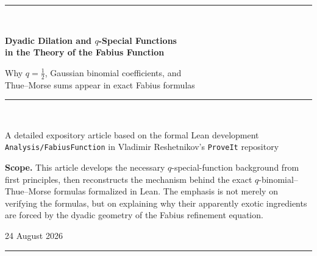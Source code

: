 \documentclass[11pt,oneside]{article}
\theoremstyle{definition}
\theoremstyle{remark}
\begin{document}
\hypersetup{pageanchor=false}

\begin{titlepage}
\centering
\vspace*{1.7cm}
{\color{DeepBlue}\rule{\textwidth}{1.1pt}}\\[1.2cm]
{\Huge\bfseries Dyadic Dilation and $q$-Special Functions\\[0.3em]
in the Theory of the Fabius Function\par}
\vspace{0.8cm}
{\Large Why $q=\tfrac12$, Gaussian binomial coefficients, and\\
Thue--Morse sums appear in exact Fabius formulas\par}
\vspace{1.1cm}
{\color{DeepBlue}\rule{0.78\textwidth}{0.7pt}}\\[1.1cm]
{\large A detailed expository article based on the formal Lean development\\
\texttt{Analysis/FabiusFunction} in Vladimir Reshetnikov's \texttt{ProveIt} repository\par}
\vfill
\begin{minipage}{0.84\textwidth}
\small
\textbf{Scope.} This article develops the necessary $q$-special-function background from first principles, then reconstructs the mechanism behind the exact $q$-binomial--Thue--Morse formulas formalized in Lean.  The emphasis is not merely on verifying the formulas, but on explaining why their apparently exotic ingredients are forced by the dyadic geometry of the Fabius refinement equation.
\end{minipage}
\vfill
{\large 24 August 2026\par}
\vspace{1cm}
{\color{DeepBlue}\rule{\textwidth}{1.1pt}}
\end{titlepage}
\hypersetup{pageanchor=true}
\end{document}
